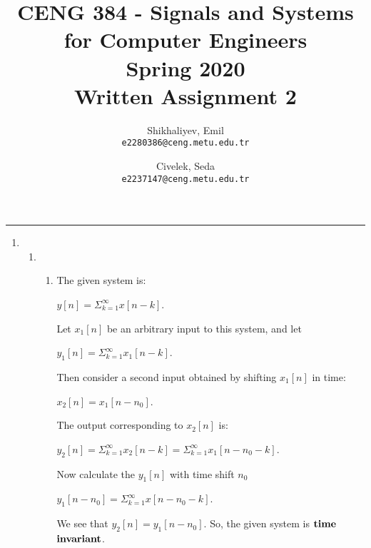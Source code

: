 \documentclass[10pt,a4paper, margin=1in]{article}
\author{
  Shikhaliyev, Emil\\
  \texttt{e2280386@ceng.metu.edu.tr}
  \and
  Civelek, Seda\\
  \texttt{e2237147@ceng.metu.edu.tr}
}
\title{CENG 384 - Signals and Systems for Computer Engineers \\
Spring 2020 \\
Written Assignment 2}
\begin{document}
\maketitle



\noindent\rule{19cm}{1.2pt}

\begin{enumerate}

\item %
    \begin{enumerate}
    \item %
    \begin{enumerate}
        \item  
        The given system is: 
        \begin{center}
            $y[n] = \Sigma^{\infty}_{k=1} x[n-k]$.
        \end{center} 
        Let $x_1[n]$ be an arbitrary input to this system, and let 
        \begin{center}
            $y_1[n] = \Sigma^{\infty}_{k=1}x_1[n-k]$.
        \end{center} 
        Then consider a second input obtained by shifting $x_1[n]$ in time: 
        \begin{center}
            $x_2[n]=x_1[n-n_0]$.
        \end{center} 
        The output corresponding to $x_2[n]$ is: 
        \begin{center}
            $y_2[n] = \Sigma^{\infty}_{k=1} x_2[n-k] = \Sigma^{\infty}_{k=1}x_1[n-n_0-k]$.
        \end{center}
        Now calculate the $y_1[n]$ with time shift $n_0$
        \begin{center}
            $y_1[n-n_0]=\Sigma^{\infty}_{k=1}x[n-n_0-k]$.
        \end{center}
        We see that $y_2[n] = y_1[n-n_0]$. So, the given system is $\bold{time}$ $\bold{invariant}$.\\
        

\end{enumerate}
\end{enumerate}
\end{enumerate}
\end{document}
